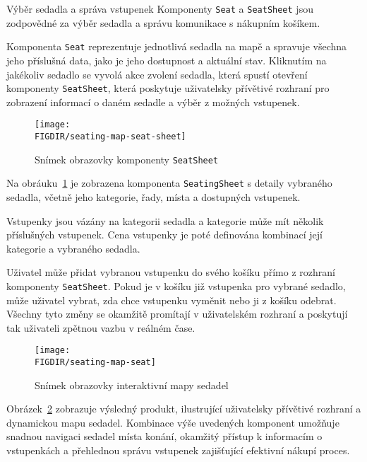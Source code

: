 \begin{subsection}{Výběr sedadla a správa vstupenek}
    \label{subsec:implementace-seating-seat}
    Komponenty \texttt{Seat} a \texttt{SeatSheet} jsou zodpovědné za výběr sedadla a správu komunikace s nákupním košíkem.

    Komponenta \texttt{Seat} reprezentuje jednotlivá sedadla na mapě a spravuje všechna jeho příslušná data, jako je jeho dostupnost a aktuální stav.
    Kliknutím na jakékoliv sedadlo se vyvolá akce zvolení sedadla, která spustí otevření komponenty \texttt{SeatSheet}, která poskytuje uživatelsky přívětivé rozhraní pro zobrazení informací o daném sedadle a výběr z možných vstupenek.

    \begin{figure}[h]
        \centering
        \texttt{[image: \\FIGDIR/seating-map-seat-sheet]}
        \caption{Snímek obrazovky komponenty \texttt{SeatSheet}}
        \label{fig:seating-map-seats-sheet}
    \end{figure}

    Na obráuku~\ref{fig:seating-map-seats-sheet} je zobrazena komponenta \texttt{SeatingSheet} s detaily vybraného sedadla, včetně jeho kategorie, řady, místa a dostupných vstupenek.

    Vstupenky jsou vázány na kategorii sedadla a kategorie může mít několik příslušných vstupenek.
    Cena vstupenky je poté definována kombinací její kategorie a vybraného sedadla.

    Uživatel může přidat vybranou vstupenku do svého košíku přímo z rozhraní komponenty \texttt{SeatSheet}.
    Pokud je v košíku již vstupenka pro vybrané sedadlo, může uživatel vybrat, zda chce vstupenku vyměnit nebo ji z košíku odebrat.
    Všechny tyto změny se okamžitě promítají v uživatelském rozhraní a poskytují tak uživateli zpětnou vazbu v reálném čase.

    \begin{figure}[h]
        \centering
        \texttt{[image: \\FIGDIR/seating-map-seat]}
        \caption{Snímek obrazovky interaktivní mapy sedadel}
        \label{fig:seating-map-seat}
    \end{figure}

    Obrázek~\ref{fig:seating-map-seat} zobrazuje výsledný produkt, ilustrující uživatelsky přívětivé rozhraní a dynamickou mapu sedadel.
    Kombinace výše uvedených komponent umožňuje snadnou navigaci sedadel místa konání, okamžitý přístup k informacím o vstupenkách a přehlednou správu vstupenek zajišťující efektivní nákupí proces.
\end{subsection}
